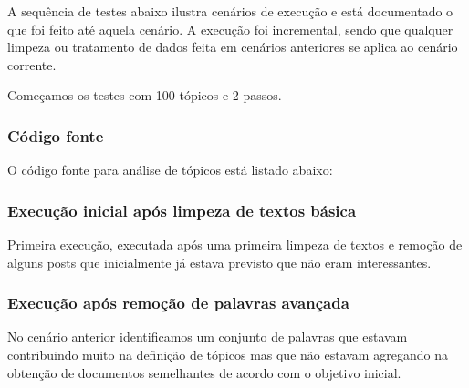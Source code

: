 A sequência de testes abaixo ilustra cenários de execução e está documentado o que foi feito até aquela cenário. A execução foi incremental, sendo que 
qualquer limpeza ou tratamento de dados feita em cenários anteriores se aplica ao cenário corrente.

Começamos os testes com 100 tópicos e 2 passos.

\subsubsection{Código fonte}

O código fonte para análise de tópicos está listado abaixo:



\subsubsection{Execução inicial após limpeza de textos básica}

Primeira execução, executada após uma primeira limpeza de textos e remoção de alguns posts que inicialmente já estava previsto que não eram interessantes.



\subsubsection{Execução após remoção de palavras avançada}

No cenário anterior identificamos um conjunto de palavras que estavam contribuindo muito na definição de tópicos mas que não estavam agregando na obtenção
de documentos semelhantes de acordo com o objetivo inicial.